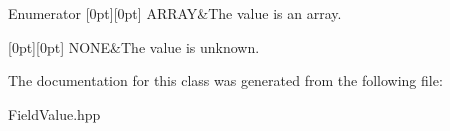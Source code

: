 \begin{DoxyEnumFields}{Enumerator}
[0pt][0pt]{}\mbox{\label{classZiApi_1_1FieldValue_ab1c22868954a17fa7a1f486d91830dd7acb4fb1757fb37c43cded35d3eb857c43}} 
A\+R\+R\+AY&The value is an array. \\
\hline

[0pt][0pt]{}\mbox{\label{classZiApi_1_1FieldValue_ab1c22868954a17fa7a1f486d91830dd7ab50339a10e1de285ac99d4c3990b8693}} 
N\+O\+NE&The value is unknown. \\
\hline

\end{DoxyEnumFields}


The documentation for this class was generated from the following file\+:\begin{DoxyCompactItemize}
\item 
Field\+Value.\+hpp\end{DoxyCompactItemize}
